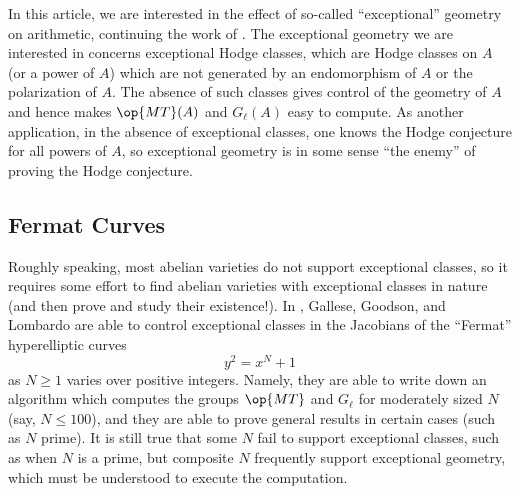 \documentclass[openany]{book}
\begin{document}
In this article, we are interested in the effect of so-called ``exceptional'' geometry on arithmetic, continuing the work of \cite{ggl-fermat}.
The exceptional geometry we are interested in concerns exceptional Hodge classes, which are Hodge classes on $A$ (or a power of $A$) which are not generated by an endomorphism of $A$ or the polarization of $A$. The absence of such classes gives control of the geometry of $A$ and hence makes $\op{MT}(A)$ and $G_\ell(A)$ easy to compute. As another application, in the absence of exceptional classes, one knows the Hodge conjecture for all powers of $A$, so exceptional geometry is in some sense ``the enemy'' of proving the Hodge conjecture.

\subsection{Fermat Curves}
Roughly speaking, most abelian varieties do not support exceptional classes, so it requires some effort to find abelian varieties with exceptional classes in nature (and then prove and study their existence!). In \cite{ggl-fermat}, Gallese, Goodson, and Lombardo are able to control exceptional classes in the Jacobians of the ``Fermat'' hyperelliptic curves
\[y^2=x^N+1\]
as $N\ge1$ varies over positive integers. Namely, they are able to write down an algorithm which computes the groups $\op{MT}$ and $G_\ell$ for moderately sized $N$ (say, $N\le100$), and they are able to prove general results in certain cases (such as $N$ prime). It is still true that some $N$ fail to support exceptional classes, such as when $N$ is a prime, but composite $N$ frequently support exceptional geometry, which must be understood to execute the computation.
\end{document}
